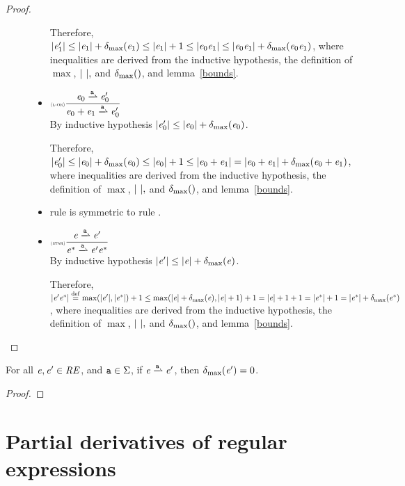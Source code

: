 \begin{proof}
\begin{description}
\begin{itemize}
          Therefore, ${\mid}{\mathit {e}_1'}{\mid}\leq {\mid}{\ensuremath{\mathit {e}}_1}{\mid}+{\delta_{\max}}({\mathit {e}_1})\leq{\mid}{\ensuremath{\mathit {e}}_1}{\mid}+1\leq{\mid}{\ensuremath{\mathit {e}}_0\ensuremath{\mathit {e}}_1}{\mid}\leq{\mid}{\ensuremath{\mathit {e}}_0\ensuremath{\mathit {e}}_1}{\mid}+{\delta_{\max}}({\mathit {e}_0\mathit {e}_1})$, where inequalities are derived from the inductive hypothesis, the definition of $\max$, ${\mid}{\ }{\mid},$ and ${\delta_{\max}}({})$, and lemma~\ref{bounds}.

    \item $\Rule{l-or}{\re_0\parDer{\sym}\re'_0}{\re_0\orop\re_1\parDer{\sym}\re'_0}{}$\\[2ex]
          By inductive hypothesis ${\mid}{\mathit {e}_0'}{\mid}\leq {\mid}{\ensuremath{\mathit {e}}_0}{\mid}+{\delta_{\max}}({\mathit {e}_0})$.

          Therefore, ${\mid}{\mathit {e}_0'}{\mid}\leq {\mid}{\ensuremath{\mathit {e}}_0}{\mid}+{\delta_{\max}}({\mathit {e}_0})\leq{\mid}{\ensuremath{\mathit {e}}_0}{\mid}+1\leq{\mid}{\ensuremath{\mathit {e}}_0\mathbin{+}\ensuremath{\mathit {e}}_1}{\mid}={\mid}{\mathit {e}_0\mathbin{+}\mathit {e}_1}{\mid}+{\delta_{\max}}({\mathit {e}_0\mathbin{+}\mathit {e}_1})$, where inequalities are derived from the inductive hypothesis, the definition of $\max$, ${\mid}{\ }{\mid},$ and ${\delta_{\max}}({})$, and lemma~\ref{bounds}.
    \item rule  is symmetric to  rule .
    \item $\Rule{star}{\re\parDer{\sym}\re'}{\starop{\re}\parDer{\sym}\re'\starop{\re}}{}$\\[2ex]
          By inductive hypothesis ${\mid}{\mathit {e}'}{\mid}\leq {\mid}{\ensuremath{\mathit {e}}}{\mid}+{\delta_{\max}}({\mathit {e}})$.

          Therefore, ${\mid}{\mathit {e}'{\mathit {e}}^*}{\mid}\stackrel{\mathrm{def}}{=}\max({\mid}{\mathit {e}'}{\mid},{{\mid}{{\mathit {e}}^*}{\mid}})+1\leq \max({\mid}{\mathit {e}}{\mid}+{\delta_{\max}}({\mathit {e}}),{{\mid}{\mathit {e}}{\mid}}+1)+1={\mid}{\mathit {e}}{\mid}+1+1={\mid}{{\mathit {e}}^*}{\mid}+1={\mid}{{\mathit {e}}^*}{\mid}+{\delta_{\max}}({{\mathit {e}}^*})$, where inequalities are derived from the inductive hypothesis, the definition of $\max$, ${\mid}{\ }{\mid},$ and ${\delta_{\max}}({})$, and lemma~\ref{bounds}.

   \end{itemize}
 \end{description}
\end{proof}

\begin{theorem}\label{zero-inc}
 For all $\mathit {e},\mathit {e}'\in\mathit {RE}$, and $\mathtt {a}\in\Sigma$, if $\re\parDer{\sym}\re'$, then ${\delta_{\max}}({\mathit {e}'})=0$.
\end{theorem}
\begin{proof}
\end{proof}
\section{Partial derivatives of regular expressions}\label{sec:regexp-par}

